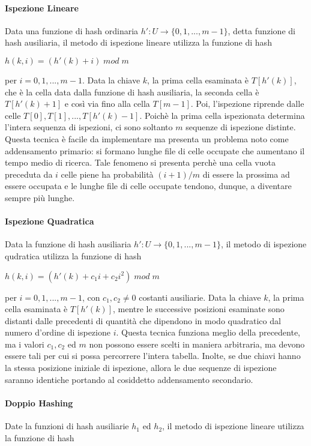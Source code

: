 \paragraph{Ispezione Lineare}
Data una funzione di hash ordinaria \(h':U\to \{0,1,...,m-1\}\), detta funzione di hash ausiliaria, il metodo di ispezione lineare utilizza la funzione di hash

\(h(k,i)=(h'(k)+i)\;mod\;m\)

\noindent per \(i=0,1,...,m-1\). Data la chiave \(k\), la prima cella esaminata è \(T[h'(k)]\), che è la cella data dalla funzione di hash ausiliaria, la seconda cella è \(T[h'(k)+1]\) e così via fino alla cella \(T[m-1]\). Poi, l'ispezione riprende dalle celle \(T[0], T[1],...,T[h'(k)-1]\). Poichè la prima cella ispezionata determina l'intera sequenza di ispezioni, ci sono soltanto \(m\) sequenze di ispezione distinte. Questa tecnica è facile da implementare ma presenta un problema noto come addensamento primario: si formano lunghe file di celle occupate che aumentano il tempo medio di ricerca. Tale fenomeno si presenta perchè una cella vuota preceduta da \(i\) celle piene ha probabilità \((i+1)/m\) di essere la prossima ad essere occupata e le lunghe file di celle occupate tendono, dunque, a diventare sempre più lunghe.

\paragraph{Ispezione Quadratica} Data la funzione di hash ausiliaria \(h':U\to \{0,1,...,m-1\}\), il metodo di ispezione qudratica utilizza la funzione di hash

\(h(k,i)=(h'(k)+c_1i+c_2i^2)\;mod\;m\)

\noindent per \(i=0,1,...,m-1\), con \(c_1, c_2 \neq 0 \) costanti ausiliarie. Data la chiave \(k\), la prima cella esaminata è \(T[h'(k)]\), mentre le successive posizioni esaminate sono distanti dalle precedenti di quantità che dipendono in modo quadratico dal numero d'ordine di ispezione \(i\). Questa tecnica funziona meglio della precedente, ma i valori \(c_1, c_2\) ed \(m\) non possono essere scelti in maniera arbitraria, ma devono essere tali per cui si possa percorrere l'intera tabella. Inolte, se due chiavi hanno la stessa posizione iniziale di ispezione, allora le due sequenze di ispezione saranno identiche portando al cosiddetto addensamento secondario.

\paragraph{Doppio Hashing} Date la funzioni di hash ausiliarie \(h_1\) ed \(h_2\), il metodo di ispezione lineare utilizza la funzione di hash

